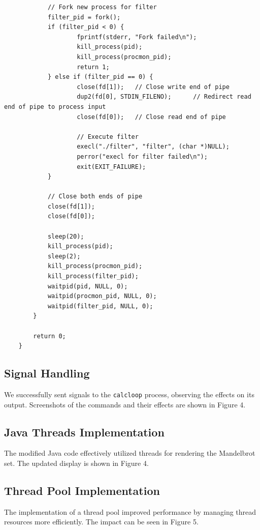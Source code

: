 \documentclass[a4paper,12pt]{article}
\begin{document}
\begin{lstlisting}
            // Fork new process for filter
            filter_pid = fork();
            if (filter_pid < 0) {
                    fprintf(stderr, "Fork failed\n");
                    kill_process(pid);
                    kill_process(procmon_pid);
                    return 1;
            } else if (filter_pid == 0) {
                    close(fd[1]);   // Close write end of pipe
                    dup2(fd[0], STDIN_FILENO);      // Redirect read end of pipe to process input
                    close(fd[0]);   // Close read end of pipe

                    // Execute filter
                    execl("./filter", "filter", (char *)NULL);
                    perror("execl for filter failed\n");
                    exit(EXIT_FAILURE);
            }

            // Close both ends of pipe
            close(fd[1]);
            close(fd[0]);
        
            sleep(20);
            kill_process(pid);
            sleep(2);
            kill_process(procmon_pid);
            kill_process(filter_pid);
            waitpid(pid, NULL, 0);
            waitpid(procmon_pid, NULL, 0);
            waitpid(filter_pid, NULL, 0);
        }

        return 0;
    }
\end{lstlisting}

\subsection{Signal Handling}
We successfully sent signals to the \texttt{calcloop} process, observing the effects on its output. Screenshots of the commands and their effects are shown in Figure 4.

\subsection{Java Threads Implementation}
The modified Java code effectively utilized threads for rendering the Mandelbrot set. The updated display is shown in Figure 4.

\subsection{Thread Pool Implementation}
The implementation of a thread pool improved performance by managing thread resources more efficiently. The impact can be seen in Figure 5.
\end{document}

